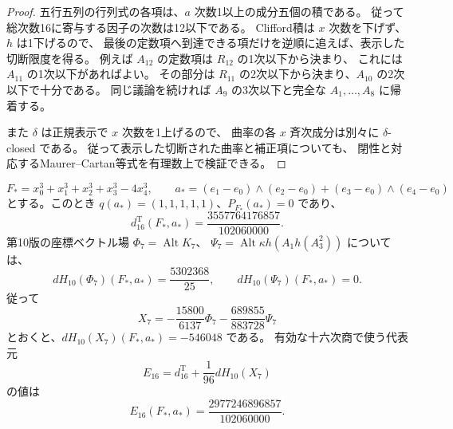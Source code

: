 \begin{proof}
五行五列の行列式の各項は、$a$ 次数1以上の成分五個の積である。
従って総次数16に寄与する因子の次数は12以下である。
Clifford積は $x$ 次数を下げず、$h$ は1下げるので、
最後の定数項へ到達できる項だけを逆順に追えば、表示した切断限度を得る。
例えば $A_{12}$ の定数項は $R_{12}$ の1次以下から決まり、
これには $A_{11}$ の1次以下があればよい。
その部分は $R_{11}$ の2次以下から決まり、$A_{10}$ の2次以下で十分である。
同じ議論を続ければ $A_9$ の3次以下と完全な $A_1,\ldots,A_8$ に帰着する。

また $\delta$ は正規表示で $x$ 次数を1上げるので、
曲率の各 $x$ 斉次成分は別々に $\delta$-closed である。
従って表示した切断された曲率と補正項についても、
閉性と対応するMaurer--Cartan等式を有理数上で検証できる。
\end{proof}

\begin{proposition}[標準点での十六次項と低次正規化の補正]
\label{prop:v13-actual-sixteenth-values}
\[
 F_*=x_0^3+x_1^3+x_2^3+x_3^3-4x_4^3,\qquad
 a_*=(e_1-e_0)\wedge(e_2-e_0)
       +(e_3-e_0)\wedge(e_4-e_0)
\]
とする。このとき $q(a_*)=(1,1,1,1,1)$、$P_{F_*}(a_*)=0$ であり、
\[
 \boxed{\displaystyle
 d^{\mathrm T}_{16}(F_*,a_*)
 =\frac{3557764176857}{102060000}.}
\]
第10版の座標ベクトル場
$\Phi_7=\operatorname{Alt}K_7$、
$\Psi_7=\operatorname{Alt}\kappa h(A_1h(A_3^2))$ については、
\[
 dH_{10}(\Phi_7)(F_*,a_*)=\frac{5302368}{25},
 \qquad
 dH_{10}(\Psi_7)(F_*,a_*)=0.
\]
従って
\[
 X_7=-\frac{15800}{6137}\Phi_7
          -\frac{689855}{883728}\Psi_7
\]
とおくと、$dH_{10}(X_7)(F_*,a_*)=-546048$ である。
有効な十六次商で使う代表元
\[
 E_{16}=d^{\mathrm T}_{16}+\frac1{96}dH_{10}(X_7)
\]
の値は
\[
 \boxed{\displaystyle
 E_{16}(F_*,a_*)=\frac{2977246896857}{102060000}.}
\]
\end{proposition}

